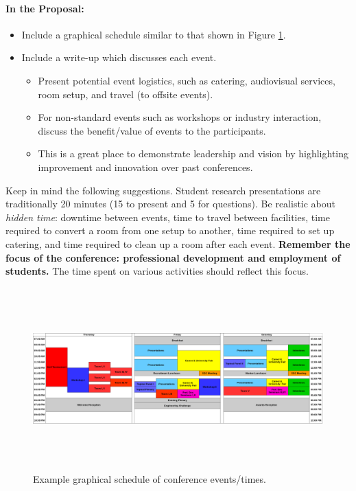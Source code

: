 \documentclass[12pt]{article}
\begin{document}
\paragraph{In the Proposal:}
\begin{itemize}
    \item{Include a graphical schedule similar to that shown in Figure \ref{fig:example_graphical_schedule}.}

    \item{Include a write-up which discusses each event.
    \begin{itemize}
        \item{Present potential event logistics, such as catering, audiovisual services, room setup, and travel (to offsite events).}
        \item{For non-standard events such as workshops or industry interaction, discuss the benefit/value of events to the participants.}
        \item{This is a great place to demonstrate leadership and vision by highlighting improvement and innovation over past conferences.}
    \end{itemize}}
\end{itemize}

Keep in mind the following suggestions. Student research presentations are traditionally 20 minutes (15 to present and 5 for questions). Be realistic about \textit{hidden time}: downtime between events, time to travel between facilities, time required to convert a room from one setup to another, time required to set up catering, and time required to clean up a room after each event. \textbf{Remember the focus of the conference: professional development and employment of students.} The time spent on various activities should reflect this focus.

\begin{figure}[h]
\centering
\includegraphics[width=17cm, height=7cm]{example_schedule.png}
\caption{Example graphical schedule of conference events/times.}
\label{fig:example_graphical_schedule}
\end{figure}
\end{document}
